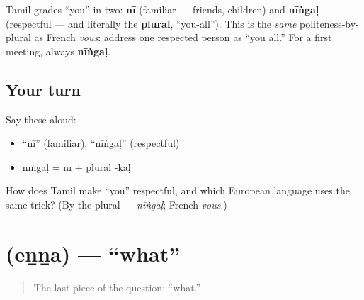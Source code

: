 \begin{grammarlens}[title={Grammar Lens: respect by the plural — again}]
Tamil grades \textquotedblleft{}you\textquotedblright{} in two: \textbf{nī} (familiar — friends, children) and \textbf{nīṅgaḷ} (respectful — and literally the \textbf{plural}, \textquotedblleft{}you-all\textquotedblright{}). This is the \emph{same} politeness-by-plural as French \emph{vous}: address one respected person as \textquotedblleft{}you all.\textquotedblright{} For a first meeting, always \textbf{nīṅgaḷ}.
\end{grammarlens}

\subsection*{Your turn}
Say these aloud:

\begin{itemize}
\raggedright
  \item \textquotedblleft{}nī\textquotedblright{} (familiar), \textquotedblleft{}nīṅgaḷ\textquotedblright{} (respectful)
  \item nīṅgaḷ = nī + plural -kaḷ
\end{itemize}

\begin{tcolorbox}[breakable,colback=teal!4,colframe=teal!35!black,title={Before you move on}]
How does Tamil make \textquotedblleft{}you\textquotedblright{} respectful, and which European language uses the same trick? (By the plural — \emph{nīṅgaḷ}; French \emph{vous}.)
\end{tcolorbox}
\section[\texorpdfstring{\ta{என்ன} (eṉṉa)}{என்ன (eṉṉa)}]{ (eṉṉa) — \textquotedblleft{}what\textquotedblright{}}

\label{lesson:TA-C02-enna}



\begin{quote}
The last piece of the question: \textquotedblleft{}what.\textquotedblright{}
\end{quote}

